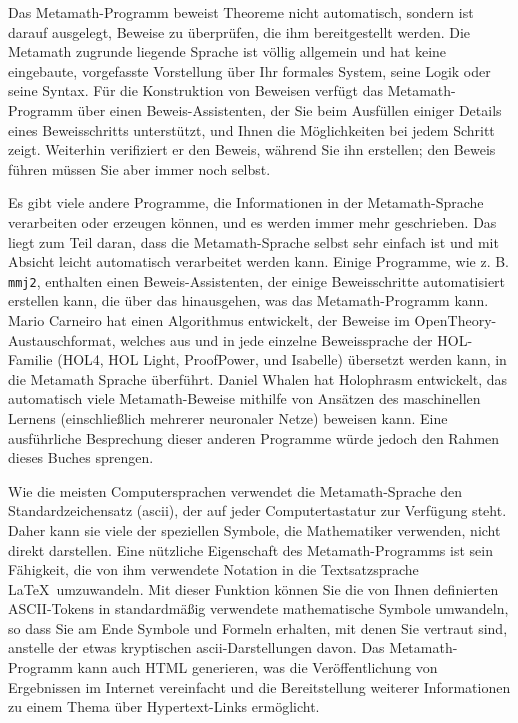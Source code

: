 Das Metamath-Programm beweist Theoreme nicht automatisch, sondern ist darauf ausgelegt, Beweise zu überprüfen, die ihm bereitgestellt werden.
Die Metamath zugrunde liegende Sprache ist völlig allgemein und hat keine eingebaute, vorgefasste Vorstellung über Ihr formales System, seine Logik oder seine Syntax.
Für die Konstruktion von Beweisen verfügt das Metamath-Programm über einen Beweis-Assistenten, der Sie beim Ausfüllen einiger Details eines Beweisschritts unterstützt, und Ihnen die Möglichkeiten bei jedem Schritt zeigt.
Weiterhin verifiziert er den Beweis, während Sie ihn erstellen; den Beweis führen müssen Sie aber immer noch selbst.

Es gibt viele andere Programme, die Informationen in der Metamath-Sprache verarbeiten oder erzeugen können, und es werden immer mehr geschrieben. Das liegt zum Teil daran, dass die Metamath-Sprache selbst sehr einfach ist und mit Absicht leicht automatisch verarbeitet werden kann.
Einige Programme, wie z. B. \texttt{mmj2}, enthalten einen Beweis-Assistenten, der einige Beweisschritte automatisiert erstellen kann, die über das hinausgehen, was das Metamath-Programm kann.
Mario Carneiro hat einen Algorithmus entwickelt, der Beweise im OpenTheory-Austauschformat, welches aus und in jede einzelne Beweissprache der HOL-Familie (HOL4, HOL Light, ProofPower, und Isabelle) übersetzt werden kann, in die Metamath Sprache \cite{DBLP:journals/corr/Carneiro14} überführt.
Daniel Whalen hat Holophrasm entwickelt, das automatisch viele Metamath-Beweise mithilfe von Ansätzen des maschinellen Lernens (einschließlich mehrerer neuronaler Netze) beweisen kann\cite{DBLP:journals/corr/Whalen16}.
Eine ausführliche Besprechung dieser anderen Programme würde jedoch den Rahmen dieses Buches sprengen.

Wie die meisten Computersprachen verwendet die Metamath-Sprache den
Standardzeichensatz ({\sc ascii}), der auf jeder Computertastatur zur Verfügung steht. Daher kann sie viele der speziellen Symbole, die Mathematiker verwenden, nicht direkt darstellen.
Eine nützliche Eigenschaft des Metamath-Programms ist sein Fähigkeit, die von ihm verwendete Notation in die Textsatzsprache \LaTeX\ umzuwandeln.
Mit dieser Funktion können Sie die von Ihnen definierten ASCII-Tokens in standardmäßig verwendete mathematische Symbole umwandeln, so dass Sie am Ende Symbole und Formeln erhalten, mit denen Sie vertraut sind, anstelle der etwas kryptischen {\sc ascii}-Darstellungen davon.
Das Metamath-Programm kann auch HTML generieren, was die Veröffentlichung von Ergebnissen im Internet vereinfacht und die Bereitstellung weiterer Informationen zu einem Thema über Hypertext-Links ermöglicht.

